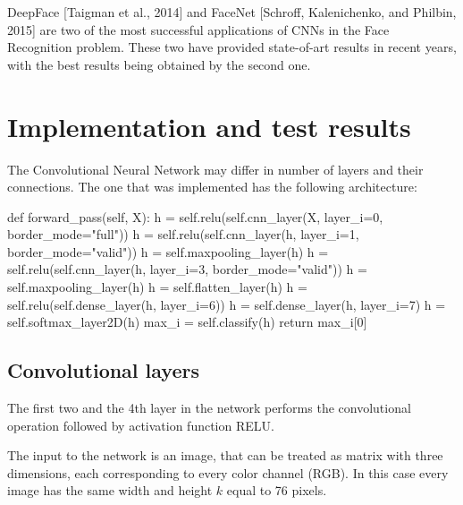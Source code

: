 DeepFace [Taigman et al., 2014] and FaceNet [Schroff, Kalenichenko, and Philbin, 2015] are two of the most successful applications of CNNs in the Face Recognition  problem. These two have provided state-of-art results in recent years, with the best results being obtained by the second one.

\section{Implementation and test results}

The Convolutional Neural Network may differ in number of layers and their connections. The one that was implemented has the following architecture:

\begin{python}
    def forward_pass(self, X):
        h = self.relu(self.cnn_layer(X, layer_i=0, border_mode="full"))
        h = self.relu(self.cnn_layer(h, layer_i=1, border_mode="valid"))
        h = self.maxpooling_layer(h)
        h = self.relu(self.cnn_layer(h, layer_i=3, border_mode="valid"))
        h = self.maxpooling_layer(h)
        h = self.flatten_layer(h)
        h = self.relu(self.dense_layer(h, layer_i=6))
        h = self.dense_layer(h, layer_i=7)
        h = self.softmax_layer2D(h)
        max_i = self.classify(h)
      	return max_i[0]
\end{python}


\subsection{Convolutional layers}

The first two and the 4th layer in the network performs the convolutional operation followed by activation function RELU.

The input to the network is an image, that can be treated as matrix with three dimensions, each corresponding to every color channel (RGB). In this case every image has the same width and height $k$ equal to 76 pixels. 

